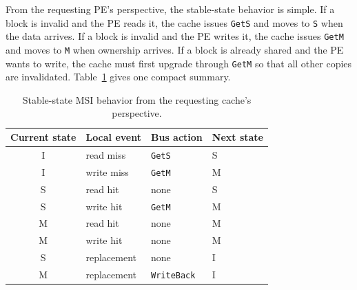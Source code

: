 From the requesting PE's perspective, the stable-state behavior is simple.
If a block is invalid and the PE reads it, the cache issues \texttt{GetS} and moves to \texttt{S} when the data arrives.
If a block is invalid and the PE writes it, the cache issues \texttt{GetM} and moves to \texttt{M} when ownership arrives.
If a block is already shared and the PE wants to write, the cache must first upgrade through \texttt{GetM} so that all other copies are invalidated.
Table~\ref{tab:mp-msi-requester} gives one compact summary.
\begin{table}[t]
    \centering
    \renewcommand{\arraystretch}{1.15}
    \begin{tabular}{|c|l|l|l|}
        \hline
        Current state & Local event & Bus action         & Next state \\
        \hline
        I             & read miss   & \texttt{GetS}      & S          \\
        \hline
        I             & write miss  & \texttt{GetM}      & M          \\
        \hline
        S             & read hit    & none               & S          \\
        \hline
        S             & write hit   & \texttt{GetM}      & M          \\
        \hline
        M             & read hit    & none               & M          \\
        \hline
        M             & write hit   & none               & M          \\
        \hline
        S             & replacement & none               & I          \\
        \hline
        M             & replacement & \texttt{WriteBack} & I          \\
        \hline
    \end{tabular}
    \caption{Stable-state MSI behavior from the requesting cache's perspective.}
    \label{tab:mp-msi-requester}
\end{table}

